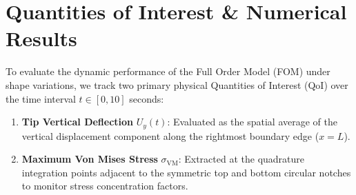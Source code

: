 \section{Quantities of Interest \& Numerical Results}
To evaluate the dynamic performance of the Full Order Model (FOM) under shape variations, we track two primary physical Quantities of Interest (QoI) over the time interval $t \in [0, 10]$ seconds:
\begin{enumerate}
    \item \textbf{Tip Vertical Deflection} $U_y(t)$: Evaluated as the spatial average of the vertical displacement component along the rightmost boundary edge ($x = L$).
    \item \textbf{Maximum Von Mises Stress} $\sigma_{\text{VM}}$: Extracted at the quadrature integration points adjacent to the symmetric top and bottom circular notches to monitor stress concentration factors.
\end{enumerate}



